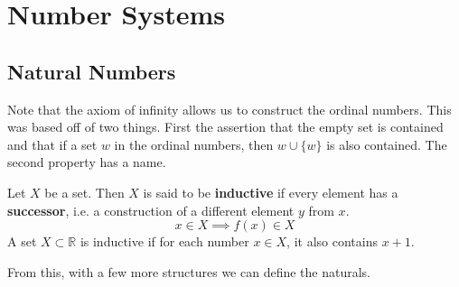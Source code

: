 \section{Number Systems} 

\subsection{Natural Numbers}

    Note that the axiom of infinity allows us to construct the ordinal numbers. This was based off of two things. First the assertion that the empty set is contained and that if a set $w$ in the ordinal numbers, then $w \cup \{w\}$ is also contained. The second property has a name. 

    \begin{definition} 
      Let $X$ be a set. Then $X$ is said to be \textbf{inductive} if every element has a \textbf{successor}, i.e. a construction of a different element $y$ from $x$.  
      \begin{equation}
        x \in X \implies f(x) \in X
      \end{equation}
      A set 
      $X \subset \mathbb{R}$ is inductive if for each number $x \in X$, it also contains $x + 1$. 
    \end{definition} 

    From this, with a few more structures we can define the naturals. 

